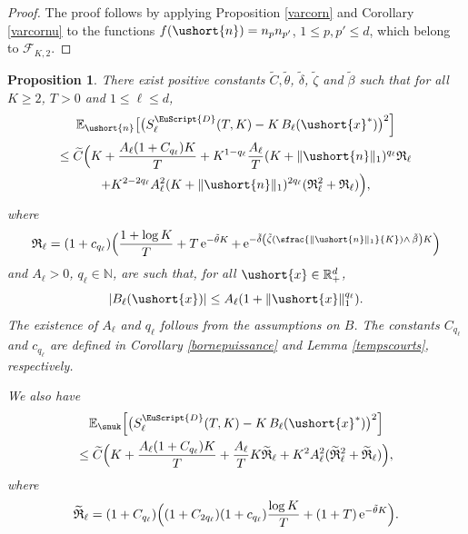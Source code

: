 \documentclass[10pt]{amsart}
\newcommand{\Psfrac}[2]{(\sfrac{#1}{#2})}
\newcommand{\scaleto}[2]{#1}
\numberwithin{equation}{section}
\theoremstyle{plain}
\newtheorem{proposition}[theorem]{Proposition}
\theoremstyle{definition}
\newcommand{\E}{{\mathbb{E}}}
\newcommand{\integers}{\mathbb{N}}
\newcommand{\rpd}{\mathbb{R}_+^d}
\newcommand{\sK}{K}
\newcommand{\vecn}{\ushort{n}}
\newcommand{\vecxf}{\ushort{x}^*}
\newcommand{\vecx}{\ushort{x}}
\newcommand{\e}{\operatorname{e}}
\newcommand{\norm}[1]{\|#1\|_{1}}\let\snorm\norm
\begin{document}
\begin{proof}
The proof follows by applying Proposition \ref{varcorn} and Corollary \ref{varcornu} to the functions
$f(\vecn)=n_p n_{p'}$, $1\leq p,p' \leq d$, which belong to $\mathscr{F}\!_{\sK,2}$.
\end{proof}

\begin{proposition}
There exist positive constants $\widetilde{C}, \tilde{\theta}$, $\tilde{\delta}$, $\tilde{\zeta}$ and $\tilde{\beta}$ such that for all $K\geq 2$, $T>0$ and $1\leq \ell\leq d$,
\begin{multline*}
\E_{\vecn}\bigl[\bigl(S^{{ \EuScript{D}}}_{\ell}(T,K)-K\,B_{\ell}(\vecxf)\bigr)^2\Bigr]\\
\le\widetilde{C} \Bigl(
K + \frac{A_\ell (1+C_{q_\ell}) K}{T} + K^{1-q_\ell} \frac{A_\ell}{T} (K+\norm{\vecn})^{q_\ell} \mathfrak{R}_\ell \\
+ K^{{2}-{2}q_\ell} A_\ell^2
(K+\norm{\vecn})^{2q_\ell}(\mathfrak{R}_\ell^2+\mathfrak{R}_\ell)
\Bigr),
\end{multline*}
where
\[
\mathfrak{R}_\ell=
(1+c_{q_\ell}) \Bigl(\frac{1+\log K}{T} + T \e^{-\tilde{\theta} K}
+ \e^{-\tilde{\delta}\left(\tilde{\zeta}\Psfrac{\|\vecn\|_{1}}{K}\wedge\, \tilde{\beta}\right)K} \Bigr)
\]
and $A_\ell>0$, $q_\ell\in\integers$, are such that, for all $\vecx \in \rpd$,
\[
|B_\ell(\vecx)|\leq A_\ell (1+ \norm{\vecx}^{\scaleto{q_\ell}{3.6pt}}).
\]
The existence of $A_\ell$ and $q_\ell$ follows from the assumptions on $B$. The constants $C_{q_\ell}$ and $c_{q_\ell}$ are
defined in Corollary \ref{bornepuissance} and Lemma \ref{tempscourts}, respectively.

We also have
\begin{multline*}
\E_{\snuk} \Bigl[\bigl(S^{{ \EuScript{D}}}_{\ell}(T,K)-K\,B_{\ell}(\vecxf)\bigr)^2 \Bigr]\\
\le
\widetilde{C} \Bigl(K + \frac{A_\ell (1+C_{q_\ell}) K}{T} + \frac{A_\ell}{T} K \widetilde{\mathfrak{R}}_\ell +
K^2 A_\ell^2 (\widetilde{\mathfrak{R}}_\ell^2+\widetilde{\mathfrak{R}}_\ell) \Bigr),
\end{multline*}
where
\[
\widetilde{\mathfrak{R}}_\ell=(1+C_{q_\ell}) \Bigl((1+C_{2q_\ell})(1+c_{q_\ell})\frac{\log K}{T} +(1+T) \e^{-\tilde{\theta} K} \Bigr).
\]
\end{proposition}
\end{document}
